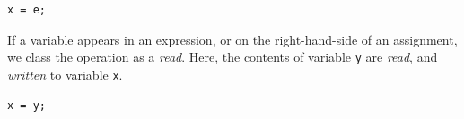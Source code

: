 \begin{lstlisting}
x = e;
\end{lstlisting}

\noindent
If a variable appears in an expression, or on the right-hand-side of an assignment, we class the operation as a \emph{read}. Here, the contents of variable \lstinline{y} are \emph{read}, and \emph{written} to variable \lstinline{x}.

\begin{lstlisting}
x = y;
\end{lstlisting}




